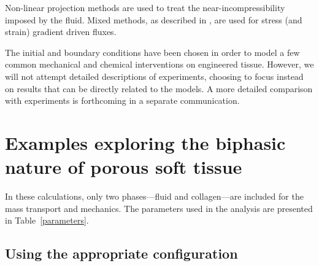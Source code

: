Non-linear projection methods \citep{simotaylorpister:85} are used to treat the
near-incompressibility imposed by the fluid. Mixed methods, as described
in \cite{Garikipatiox2:01}, are used for stress (and strain) gradient
driven fluxes.

The initial and boundary
conditions have been chosen in order to model a few common mechanical and
chemical interventions on engineered tissue. However, we will not
attempt detailed descriptions of experiments, choosing to focus
instead on results that can be directly related to the models. A more
detailed comparison with experiments is forthcoming in a separate
communication.

\section{Examples exploring the biphasic nature of porous soft tissue}
\label{biphasic-examples-1}

In these calculations, only two phases---fluid and collagen---are
included for the mass transport and mechanics. The parameters used in the analysis
are presented in Table~\ref{parameters}. 


\subsection{Using the appropriate configuration}
\label{appropriate-configuration}







